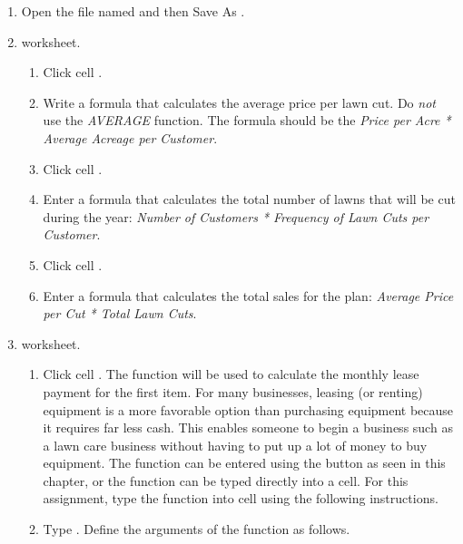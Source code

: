 \begin{enumerate}
	\item Open the file named  and then Save As .

	\item {} worksheet.

	\begin{enumerate}
		\item Click cell .
	
		\item Write a formula that calculates the average price per lawn cut. Do \textit{not} use the \textit{AVERAGE} function. The formula should be the \textit{Price per Acre * Average Acreage per Customer}.
		
		\item Click cell .
		
		\item Enter a formula that calculates the total number of lawns that will be cut during the year: \textit{Number of Customers * Frequency of Lawn Cuts per Customer}.
		
		\item Click cell .
		
		\item Enter a formula that calculates the total sales for the plan: \textit{Average Price per Cut * Total Lawn Cuts}.
	\end{enumerate}
	
	\item {} worksheet.
	
	\begin{enumerate}
		\item Click cell . The  function will be used to calculate the monthly lease payment for the first item. For many businesses, leasing (or renting) equipment is a more favorable option than purchasing equipment because it requires far less cash. This enables someone to begin a business such as a lawn care business without having to put up a lot of money to buy equipment. The  function can be entered using the  button as seen in this chapter, or the  function can be typed directly into a cell. For this assignment, type the function into cell  using the following instructions.
		
		\item Type . Define the arguments of the function as follows.
	

\end{enumerate}
\end{enumerate}
